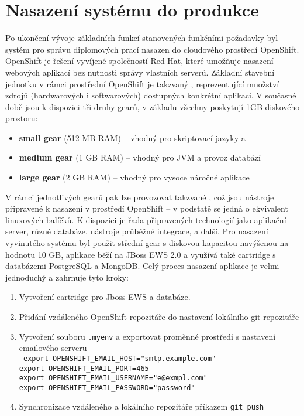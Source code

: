 \chapter{Nasazení systému do produkce}
Po ukončení vývoje základních funkcí stanovených funkčními požadavky byl systém pro správu diplomových prací nasazen do cloudového prostředí OpenShift. OpenShift je  řešení vyvíjené společností Red Hat, které umožňuje nasazení webových aplikací bez nutnosti správy vlastních serverů. Základní stavební jednotku v rámci prostřední OpenShift je takzvaný , reprezentující množství zdrojů (hardwarových i softwarových) dostupných konkrétní aplikaci. V současné době jsou k dispozici tři druhy gearů, v základu všechny poskytují 1GB diskového prostoru:

\begin{itemize}
\item \textbf{small gear} (512 MB RAM) -- vhodný pro skriptovací jazyky a
\item \textbf{medium gear} (1 GB RAM) -- vhodný pro JVM a provoz databází
\item \textbf{large gear} (2 GB RAM)  -- vhodný pro vysoce náročné aplikace
\end{itemize}

V rámci jednotlivých gearů pak lze provozovat takzvané , což jsou nástroje připravené k nasazení v prostředí OpenShift -- v podstatě se jedná o ekvivalent linuxových balíčků. K dispozici je řada připravených technologií jako aplikační server, různé databáze, nástroje průběžné integrace, a další. Pro nasazení vyvinutého systému byl použit střední gear s diskovou kapacitou navýšenou na hodnotu 10 GB, aplikace běží na JBoss EWS 2.0 a využívá také cartridge s databázemi PostgreSQL a MongoDB. Celý proces nasazení aplikace je velmi jednoduchý a zahrnuje tyto kroky:

\begin{enumerate}
\item Vytvoření cartridge pro Jboss EWS a databáze.
\item Přidání vzdáleného OpenShift repozitáře do nastavení lokálního git repozitáře
\item Vytvoření souboru \texttt{.myenv} a exportovat proměnné prostředí s nastavení emailového serveru \\
\texttt{
export OPENSHIFT\_EMAIL\_HOST="smtp.example.com"\\
export OPENSHIFT\_EMAIL\_PORT=465\\
export OPENSHIFT\_EMAIL\_USERNAME="e@exmpl.com"\\
export OPENSHIFT\_EMAIL\_PASSWORD="password"\\
}
\item Synchronizace vzdáleného a lokálního repozitáře příkazem \texttt{git push}
\end{enumerate}

